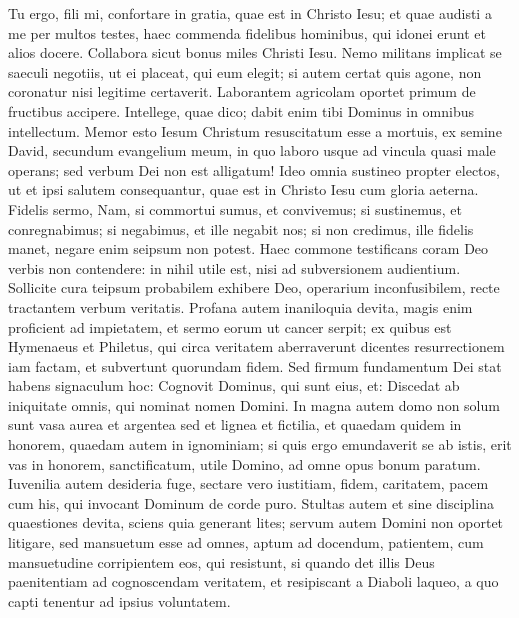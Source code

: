 \begin{biblechapter} 
\verse Tu ergo, fili mi, confortare in gratia, quae est in Christo Iesu; 
\verse et quae audisti a me per multos testes, haec commenda fidelibus hominibus, qui idonei erunt et alios docere. 
\verse Collabora sicut bonus miles Christi Iesu. 
\verse Nemo militans implicat se saeculi negotiis, ut ei placeat, qui eum elegit; 
\verse si autem certat quis agone, non coronatur nisi legitime certaverit. 
\verse Laborantem agricolam oportet primum de fructibus accipere. 
\verse Intellege, quae dico; dabit enim tibi Dominus in omnibus intellectum. 
\verse Memor esto Iesum Christum resuscitatum esse a mortuis, ex semine David, secundum evangelium meum, 
\verse in quo laboro usque ad vincula quasi male operans; sed verbum Dei non est alligatum! 
\verse Ideo omnia sustineo propter electos, ut et ipsi salutem consequantur, quae est in Christo Iesu cum gloria aeterna. 
\verse Fidelis sermo, Nam, si commortui sumus, et convivemus; 
\verse si sustinemus, et conregnabimus; si negabimus, et ille negabit nos; 
\verse si non credimus, ille fidelis manet, negare enim seipsum non potest. 
\verse Haec commone testificans coram Deo verbis non contendere: in nihil utile est, nisi ad subversionem audientium. 
\verse Sollicite cura teipsum probabilem exhibere Deo, operarium inconfusibilem, recte tractantem verbum veritatis. 
\verse Profana autem inaniloquia devita, magis enim proficient ad impietatem, 
\verse et sermo eorum ut cancer serpit; ex quibus est Hymenaeus et Philetus, 
\verse qui circa veritatem aberraverunt dicentes resurrectionem iam factam, et subvertunt quorundam fidem. 
\verse Sed firmum fundamentum Dei stat habens signaculum hoc: Cognovit Dominus, qui sunt eius, et: Discedat ab iniquitate omnis, qui nominat nomen Domini. 
\verse In magna autem domo non solum sunt vasa aurea et argentea sed et lignea et fictilia, et quaedam quidem in honorem, quaedam autem in ignominiam; 
\verse si quis ergo emundaverit se ab istis, erit vas in honorem, sanctificatum, utile Domino, ad omne opus bonum paratum. 
\verse Iuvenilia autem desideria fuge, sectare vero iustitiam, fidem, caritatem, pacem cum his, qui invocant Dominum de corde puro. 
\verse Stultas autem et sine disciplina quaestiones devita, sciens quia generant lites; 
\verse servum autem Domini non oportet litigare, sed mansuetum esse ad omnes, aptum ad docendum, patientem, 
\verse cum mansuetudine corripientem eos, qui resistunt, si quando det illis Deus paenitentiam ad cognoscendam veritatem,  
\verse et resipiscant a Diaboli laqueo, a quo capti tenentur ad ipsius voluntatem. 
\end{biblechapter}

